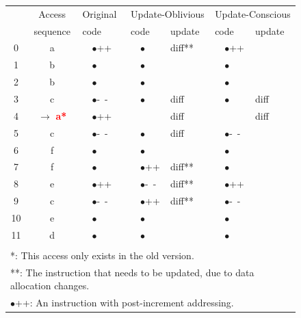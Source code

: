 \begin{figure}[htbp]
\begin{small}
\begin{center}
\begin{tabular}{|c|c||l||l|l||l|l|} \hline\hline
    & Access   & Original      & \multicolumn{2}{l||}{Update-Oblivious} & \multicolumn{2}{l|}{Update-Conscious} \\ 
\cline{4-7}
    & sequence & code         & code        & update & code         & update \\ \hline \hline
 0  & a        & ~~$\bullet$++  & ~~$\bullet$   & diff**   & ~~$\bullet$++  &        \\ 
 1  & b        & ~~$\bullet$    & ~~$\bullet$   &        & ~~$\bullet$    &        \\
 2  & b        & ~~$\bullet$    & ~~$\bullet$   &        & ~~$\bullet$    &        \\
 3  & c        & ~~$\bullet$-~- & ~~$\bullet$   & diff   & ~~$\bullet$    & diff   \\
 4  & $\rightarrow$ \textcolor{red}{\bf{a*}}
               & ~~$\bullet$++  &               & diff   &                & diff   \\
 5  & c        & ~~$\bullet$-~- & ~~$\bullet$   & diff   & ~~$\bullet$-~- &        \\
 6  & f        & ~~$\bullet$    & ~~$\bullet$   &        & ~~$\bullet$    &        \\
 7  & f        & ~~$\bullet$    & ~~$\bullet$++ & diff**   & ~~$\bullet$    &        \\
 8  & e        & ~~$\bullet$++  & ~~$\bullet$-~-& diff**   & ~~$\bullet$++  &        \\
 9  & c        & ~~$\bullet$-~- & ~~$\bullet$++ & diff**   & ~~$\bullet$-~- &        \\
 10 & e        & ~~$\bullet$    & ~~$\bullet$   &        & ~~$\bullet$    &        \\
 11 & d        & ~~$\bullet$    & ~~$\bullet$   &        & ~~$\bullet$    &        \\ \hline 
\multicolumn{7}{l}{ } \\
\multicolumn{7}{l}{*: This access only exists in the old version.}\\
\multicolumn{7}{l}{**: The instruction that needs to be updated, due to data allocation changes.}\\
\multicolumn{7}{l}{$\bullet$++: An instruction with post-increment addressing.}\\

\end{tabular}
\end{center}
\end{small}
\end{figure}

